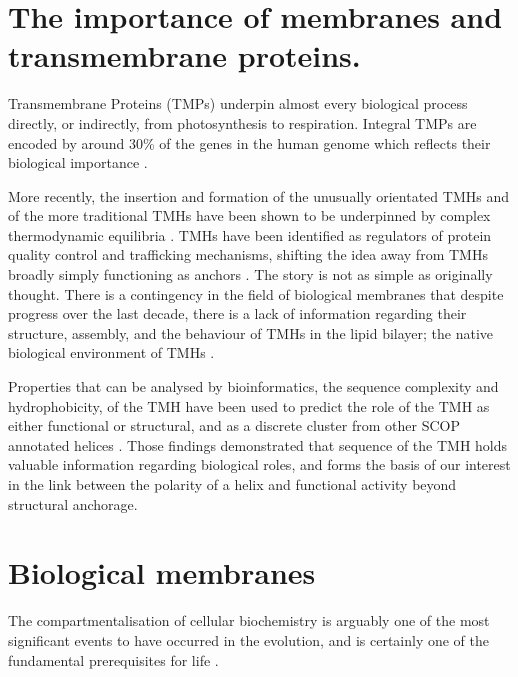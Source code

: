 \documentclass[12pt,PhD,twoside]{muthesis}
\begin{document}
\section{The importance of membranes and transmembrane proteins.}
Transmembrane Proteins (TMPs) underpin almost every biological process directly, or indirectly, from photosynthesis to respiration. Integral TMPs are encoded by around 30\% of the genes in the human genome which reflects their biological importance \cite{Almen2009}.

More recently, the insertion and formation of the unusually orientated TMHs and of the more traditional TMHs have been shown to be underpinned by complex thermodynamic equilibria \cite{Cymer2014}. TMHs have been identified as regulators of protein quality control and trafficking mechanisms, shifting the idea away from TMHs broadly simply functioning as anchors \cite{Hessa2011}. The story is not as simple as originally thought. There is a contingency in the field of biological membranes that despite progress over the last decade, there is a lack of information regarding their structure, assembly, and the behaviour of TMHs in the lipid bilayer; the native biological environment of TMHs \cite{Ladokhin2015, Cymer2014}.

Properties that can be analysed by bioinformatics, the sequence complexity and hydrophobicity, of the TMH have been used to predict the role of the TMH as either functional or structural, and as a discrete cluster from other SCOP annotated helices \cite{Wong2012}. Those findings demonstrated that sequence of the TMH holds valuable information regarding biological roles, and forms the basis of our interest in the link between the polarity of a helix and functional activity beyond structural anchorage.

\section{Biological membranes}


The compartmentalisation of cellular biochemistry is arguably one of the most significant events to have occurred in the evolution, and is certainly one of the fundamental prerequisites for life \cite{Koshland2002}.
\end{document}
